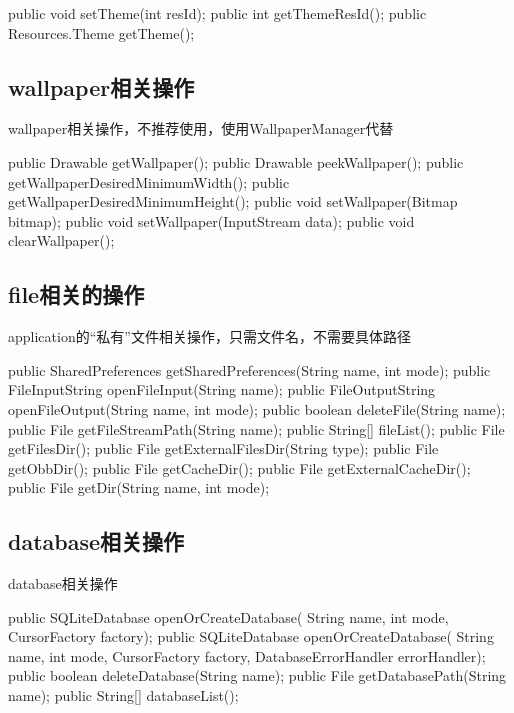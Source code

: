 \begin{javacode}
public void setTheme(int resId);
public int getThemeResId();
public Resources.Theme getTheme();
\end{javacode}

\subsection[wallpaper相关操作]{wallpaper相关操作}
wallpaper相关操作，不推荐使用，使用WallpaperManager代替

\begin{javacode}
public Drawable getWallpaper();
public Drawable peekWallpaper();
public getWallpaperDesiredMinimumWidth();
public getWallpaperDesiredMinimumHeight();
public void setWallpaper(Bitmap bitmap);
public void setWallpaper(InputStream data);
public void clearWallpaper();
\end{javacode}

\subsection[file相关的操作]{file相关的操作}
application的“私有”文件相关操作，只需文件名，不需要具体路径

\begin{javacode}
public SharedPreferences getSharedPreferences(String name, int mode);
public FileInputString openFileInput(String name);
public FileOutputString openFileOutput(String name, int mode);
public boolean deleteFile(String name);
public File getFileStreamPath(String name);
public String[] fileList();
public File getFilesDir();
public File getExternalFilesDir(String type);
public File getObbDir();
public File getCacheDir();
public File getExternalCacheDir();
public File getDir(String name, int mode);
\end{javacode}

\subsection[database相关操作]{database相关操作}
database相关操作

\begin{javacode}
public SQLiteDatabase openOrCreateDatabase(
    String name, int mode, CursorFactory factory);
public SQLiteDatabase openOrCreateDatabase(
    String name, int mode, CursorFactory factory, DatabaseErrorHandler errorHandler);
public boolean deleteDatabase(String name);
public File getDatabasePath(String name);
public String[] databaseList();
\end{javacode}

